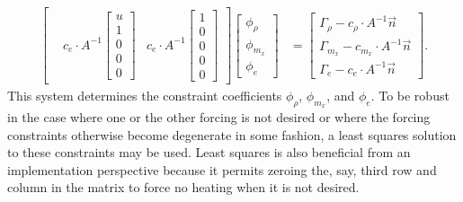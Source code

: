 \documentclass[letterpaper,11pt,nointlimits,reqno]{amsart}
\begin{document}
\begin{align}
\begin{bmatrix}
    &
    c_{e} \cdot A^{-1} \begin{bmatrix} u \\ 1 \\ 0 \\ 0 \\ 0 \end{bmatrix}
    &
    c_{e} \cdot A^{-1} \begin{bmatrix} 1 \\ 0 \\ 0 \\ 0 \\ 0 \end{bmatrix}
  \end{bmatrix}
  \begin{bmatrix}
    \phi_\rho
    \\
    \phi_{m_x}
    \\
    \phi_{e}
  \end{bmatrix}
&=
  \begin{bmatrix}
    \Gamma_\rho - c_\rho \cdot{} A^{-1} \vec{n}
    \\
    \Gamma_{m_x} - c_{m_x} \cdot{} A^{-1} \vec{n}
    \\
    \Gamma_{e} - c_{e} \cdot{} A^{-1} \vec{n}
  \end{bmatrix}
.
\end{align}
This system determines the constraint coefficients $\phi_\rho$, $\phi_{m_x}$,
and $\phi_{e}$.  To be robust in the case where one or the other forcing is not
desired or where the forcing constraints otherwise become degenerate in some
fashion, a least squares solution to these constraints may be used.  Least
squares is also beneficial from an implementation perspective because it
permits zeroing the, say, third row and column in the matrix to force no
heating when it is not desired.


\newcommand*{\doi}[1]{\href{http://dx.doi.org/\detokenize{#1}}{doi: #1}}


\end{document}
